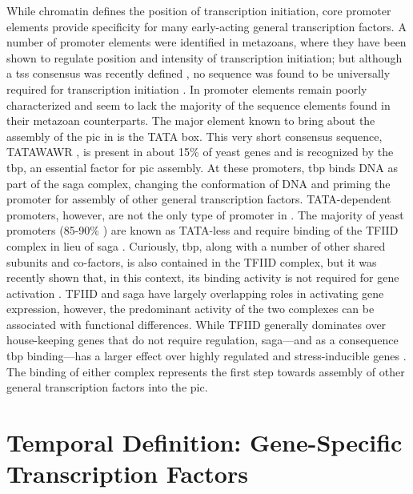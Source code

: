 While chromatin defines the position of transcription initiation, core promoter elements provide specificity for many early-acting general transcription factors. 
A number of promoter elements were identified in metazoans, where they have been shown to regulate position and intensity of transcription initiation; but although a \gls{tss} consensus was recently defined \cite{malabat:2015:quality}, no sequence was found to be universally required for transcription initiation \cite{butler:2002:RNA}.
In \cer{} promoter elements remain poorly characterized and seem to lack the majority of the sequence elements found in their metazoan counterparts. 
The major element known to bring about the assembly of the \gls{pic} in \cer{} is the TATA box.
This very short consensus sequence, TATAWAWR \citep{basehoar:2004:identification}, is present in about 15\% of yeast genes \cite{kamenova:2014:mutations} and is recognized by the \gls{tbp}, an essential factor for \gls{pic} assembly. 
At these promoters, \gls{tbp} binds DNA as part of the \gls{saga} complex, changing the conformation of DNA and priming the promoter for assembly of other general transcription factors. 
TATA-dependent promoters, however, are not the only type of promoter in \cer{}. 
The majority of yeast promoters (85-90\% )  are known as TATA-less and require binding of the TFIID complex in lieu of \gls{saga} \citep{rhee:2012:genomewide}. 
Curiously, \gls{tbp}, along with a number of other shared subunits and co-factors, is also contained in the TFIID complex, but it was recently shown that, in this context, its binding activity is not required for gene activation \cite{kamenova:2014:mutations}.
TFIID and \gls{saga} have largely overlapping roles in activating gene expression, however, the predominant activity of the two complexes can be associated with functional differences.
While TFIID generally dominates over house-keeping genes that do not require regulation, \gls{saga}---and as a consequence \gls{tbp} binding---has a larger effect over highly regulated and stress-inducible genes \citep{huisinga:2004:genomewide}.
The binding of either complex represents the first step towards assembly of other general transcription factors into the \gls{pic}.

\singlespacing
\section{Temporal Definition: Gene-Specific Transcription Factors}
\doublespacing


